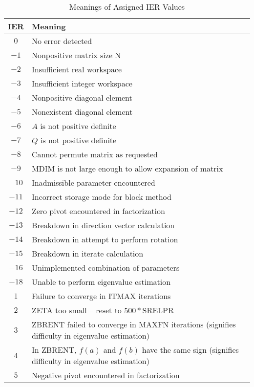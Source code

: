 \begin{table}[h]
\begin{center}
\begin{tabular}{|c|p{3.5in}|}  \hline
        IER   &    Meaning    \\   \hline
        $0$   &    No error detected \\   \hline
       $-1$   &    Nonpositive matrix size N \\
       $-2$   &    Insufficient real workspace \\
       $-3$   &    Insufficient integer workspace \\
       $-4$   &    Nonpositive diagonal element \\
       $-5$   &    Nonexistent diagonal element \\
       $-6$   &    $A$ is not positive definite \\
       $-7$   &    $Q$ is not positive definite \\
       $-8$   &    Cannot permute matrix as requested \\
       $-9$   &    MDIM is not large enough to allow expansion
                     of matrix \\
      $-10$   &    Inadmissible parameter encountered \\
      $-11$   &    Incorrect storage mode for block method \\
      $-12$   &    Zero pivot encountered in factorization \\
      $-13$   &    Breakdown in direction vector calculation \\
      $-14$   &    Breakdown in attempt to perform rotation \\
      $-15$   &    Breakdown in iterate calculation \\
      $-16$   &    Unimplemented combination of parameters \\
      $-18$   &    Unable to perform eigenvalue estimation \\  \hline
        $1$   &    Failure to converge in ITMAX iterations \\
        $2$   &    ZETA too small -- reset to $500*$SRELPR \\
        $3$   &    ZBRENT failed to converge in MAXFN iterations
                     (signifies difficulty in eigenvalue
                      estimation)                       \\
        $4$   &    In ZBRENT, $f(a)$ and $f(b)$ have the same sign
                         (signifies difficulty in eigenvalue
                          estimation)                  \\
        $5$   &    Negative pivot encountered in factorization  \\
                   \hline
\end{tabular}
\caption{Meanings of Assigned IER Values}
\end{center}
\end{table}
 
